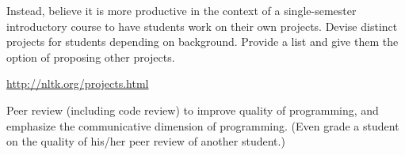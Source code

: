 \documentclass[11pt]{article}
\begin{document}
Instead, believe it is more productive in the context of a single-semester introductory
course to have students work on their own projects.  Devise distinct projects for
students depending on background.  Provide a list and give them the option of proposing
other projects.

\url{http://nltk.org/projects.html}

Peer review (including code review) to improve quality of programming, and
emphasize the communicative dimension of programming.
(Even grade a student on the quality of his/her peer review of another student.)






\end{document}
